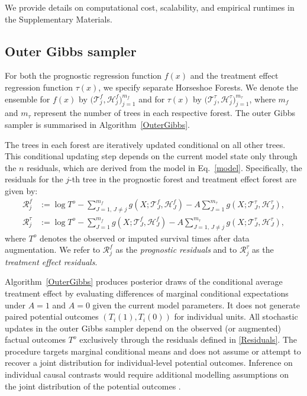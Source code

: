We provide details on computational cost, scalability, and empirical runtimes in the Supplementary Materials.

\subsection{Outer Gibbs sampler}\label{sec:outer_gibbs}
For both the prognostic regression function $f(x)$ and the treatment effect regression function $\tau(x)$, we specify separate Horseshoe Forests. 
We denote the ensemble for $f(x)$ by $\big(\mathcal{T}_j^f, \mathcal{H}_j^f\big)_{j=1}^{m_f}$ and for $\tau(x)$ by $\big(\mathcal{T}^\tau_j, \mathcal{H}^\tau_j\big)_{j=1}^{{m_\tau}}$, where $m_f$ and ${m_\tau}$ represent the number of trees in each respective forest. 
The outer Gibbs sampler is summarised in Algorithm~\ref{OuterGibbs}.

The trees in each forest are iteratively updated conditional on all other trees. 
This conditional updating step depends on the current model state only through the $n$ residuals, which are derived from the model in Eq.~\eqref{model}.
Specifically, the residuals for the $j$-th tree in the prognostic forest and treatment effect forest are given by:
\begin{subequations}\label{Residuals}
\begin{align}
\mathcal{R}_j^f &:= \log T^o - \sum_{J=1,\, J\neq j}^{m_f} g(X; \mathcal{T}_J^f, \mathcal{H}_J^f) - A \sum_{J=1}^{{m_\tau}} g(X; \mathcal{T}^\tau_J, \mathcal{H}^\tau_J), \label{Residuals_f} \\
\mathcal{R}^\tau_j &:= \log T^o - \sum_{J=1}^{m_f} g(X; \mathcal{T}_J^f, \mathcal{H}_J^f) - A \sum_{J=1,\, J\neq j}^{{m_\tau}} g(X; \mathcal{T}^\tau_J, \mathcal{H}^\tau_J), \label{Residuals_tau}
\end{align}
\end{subequations}
where $T^o$ denotes the observed or imputed survival times after data augmentation. 
We refer to $\mathcal{R}_j^f$ as the \textsl{prognostic residuals} and to $\mathcal{R}_j^\tau$ as the \textsl{treatment effect residuals}.


Algorithm~\ref{OuterGibbs} produces posterior draws of the conditional average treatment effect by evaluating differences of marginal conditional expectations under $A=1$ and $A=0$ given the current model parameters.
It does not generate paired potential outcomes $(T_i(1),T_i(0))$ for individual units.
All stochastic updates in the outer Gibbs sampler depend on the observed (or augmented) factual outcomes $T^o$ exclusively through the residuals defined in \eqref{Residuals}.
The procedure targets marginal conditional means and does not assume or attempt to recover a joint distribution for individual-level potential outcomes.
Inference on individual causal contrasts would require additional modelling assumptions on the joint distribution of the potential outcomes \citep{Oganisian2025Untangling, Li2023BayesianCausal}.





